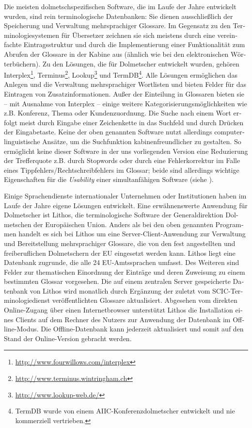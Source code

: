 \documentclass[output=paper]{LSP/langsci}
\begin{document}
\begin{otherlanguage}{ngerman}
 
Die meisten dolmetschspezifischen Software, die im Laufe der Jahre entwickelt wurden, sind rein terminologische Datenbanken: Sie dienen ausschließlich der Speicherung und Verwaltung mehrsprachiger Glossare. Im Gegensatz zu den Terminologiesystemen für Übersetzer zeichnen sie sich meistens durch eine vereinfachte Eintragsstruktur und durch die Implementierung einer Funktionalität zum Abrufen der Glossare in der Kabine aus (ähnlich wie bei den elektronischen Wörterbüchern). Zu den Lösungen, die für Dolmetscher entwickelt wurden, gehören Interplex\footnote{\url{http://www.fourwillows.com/interplex}}, Terminus\footnote{\url{http://www.terminus.wintringham.ch}}, Lookup\footnote{\url{http://www.lookup-web.de/}} und TermDB\footnote{ TermDB wurde von einem AIIC-Konferenzdolmetscher entwickelt und nie kommerziell vertrieben.}. Alle Lösungen ermöglichen das Anlegen und die Verwaltung mehrsprachiger Wortlisten und bieten Felder für das Eintragen von Zusatzinformationen. Außer der Einteilung in Glossaren bieten sie -- mit Ausnahme von Interplex -- einige weitere Kategorisierungsmöglichkeiten wie z.B. Konferenz, Thema oder Kundenzuordnung. Die Suche nach einem Wort erfolgt meist durch Eingabe einer Zeichenkette in das Suchfeld und durch Drücken der Eingabetaste. Keine der oben genannten Software nutzt allerdings computerlinguistische Ansätze, um die Suchfunktion kabinenfreundlicher zu gestalten. So ermöglicht keine dieser Software in der uns vorliegenden Version eine Reduzierung der Trefferquote z.B. durch Stopwords oder durch eine Fehlerkorrektur im Falle eines Tippfehlers/Rechtschreibfehlers im Glossar; beide sind allerdings wichtige Eigenschaften für die \textit{Usability} einer simultanfähigen Software (siehe ).

Einige Sprachendienste internationaler Unternehmen oder Institutionen haben im Laufe der Jahre eigene Lösungen entwickelt. Eine erwähnenswerte Anwendung für Dolmetscher ist Lithos, die terminologische Software der Generaldirektion Dolmetschen der Europäischen Union. Anders als bei den oben genannten Programmen handelt es sich bei Lithos um eine Server-Client-Anwendung zur Verwaltung und Bereitstellung mehrsprachiger Glossare, die von den fest angestellten und freiberuflichen Dolmetschern der EU eingesetzt werden kann. Lithos liegt eine Datenbank zugrunde, die alle 24 EU-Amtssprachen umfasst. Des Weiteren sind Felder zur thematischen Einordnung der Einträge und deren Zuweisung zu einem bestimmten Glossar vorgesehen. Die auf einem zentralen Server gespeicherte Datenbank von Lithos wird monatlich durch Ergänzung der zuletzt vom SCIC-Terminologiedienst veröffentlichten Glossare aktualisiert. Abgesehen vom direkten Online-Zugang über einen Internetbrowser unterstützt Lithos die Installation eines Clients auf dem Rechner des Nutzers zur Anwendung der Datenbank im Offline-Modus. Die Offline-Datenbank kann jederzeit aktualisiert und somit auf den Stand der Online-Version gebracht werden.


\end{otherlanguage}
\end{document}
